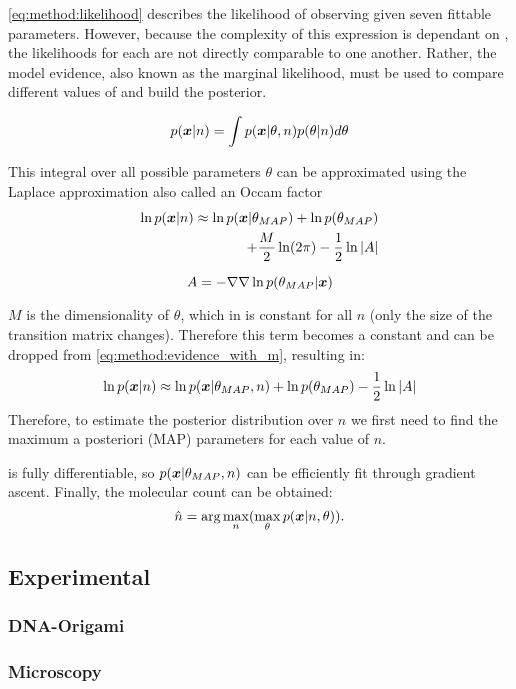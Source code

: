 \eqref{eq:method:likelihood} describes the likelihood of observing \trace given seven fittable parameters.
  However, because the complexity of this expression is dependant on \n, the likelihoods for each \n are not directly comparable to one another.
  Rather, the model evidence, also known as the marginal likelihood, must be used to compare different values of \n and build the posterior. 

  \begin{equation*}
    p(\bm{x} | n) = \int p(\bm{x} | \theta, n) p(\theta | n) d\theta
  \end{equation*}

  This integral over all possible parameters $\theta$ can be approximated using the 
  Laplace approximation also called an Occam factor \cite{bishop_pattern_2006}
  \begin{align*}
    \ln p(\bm{x} | n) \approx \ln p(\bm{x} | \theta_{MAP}) + \ln p(\theta_{MAP}) &\\
    + \frac{M}{2} \ln(2\pi) - \frac{1}{2} \ln |A|
    \label{eq:method:evidence_with_m}
  \end{align*}

  \begin{equation*}
    A = -\nabla \nabla \ln p(\theta_{MAP} | \bm{x})
  \end{equation*}

  $M$ is the dimensionality of $\theta$, which in \ours is constant
  for all $n$ (only the size of the transition matrix changes).
  Therefore this term becomes a constant and can be dropped from 
  \eqref{eq:method:evidence_with_m}, resulting in:
  \begin{equation}
    \ln p(\bm{x} | n) \approx \ln p(\bm{x} | \theta_{MAP}, n) + \ln p(\theta_{MAP}) - \frac{1}{2} \ln |A|
    \label{eq:method:evidence}
  \end{equation}
  Therefore, to estimate the posterior distribution over $n$ we first need to 
  find the maximum a posteriori (MAP) parameters for each value of $n$. 

  \ours is fully differentiable, so $p(\bm{x} | \theta_{MAP}, n)$ can be efficiently 
  fit through gradient ascent.
  Finally, the molecular count can be obtained:
  \begin{equation}
      \hat{n} =
      \text{arg}\max_{n}(
      \max_\theta
      p(\bm{x}|n,\theta))
    \text{.}
    \label{eq:method:optimization}
  \end{equation}

\subsection{Experimental}
\subsubsection{DNA-Origami}
\subsubsection{Microscopy}


